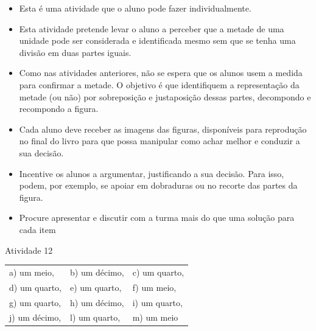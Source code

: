  \vspace{.1cm}

   \vspace{.1cm}

\begin{itemize} %
    \item       Esta é uma atividade que o aluno pode fazer individualmente.
    \item       Esta atividade pretende levar o aluno a perceber que a metade de uma unidade pode ser considerada e identificada mesmo sem que se tenha uma divisão em duas partes iguais.
    \item       Como nas atividades anteriores, não se espera que os alunos usem a medida para confirmar a metade. O objetivo é que identifiquem a representação da metade (ou não) por sobreposição e justaposição dessas partes, decompondo e recompondo a figura.
    \item       Cada aluno deve receber as imagens das figuras, disponíveis para reprodução no final do livro para que possa manipular como achar melhor e conduzir a sua decisão.
    \item       Incentive os alunos a argumentar, justificando a sua decisão. Para isso, podem, por exemplo, se apoiar em dobraduras ou no recorte das partes da figura.
    \item       Procure apresentar e discutir com a turma mais do que uma solução para cada item
\end{itemize} %


\begin{resposta*}{Atividade 12}

\begin{tabular}{lll}
a) um meio,&  b) um décimo,& c) um quarto,\\
d) um quarto,& e) um quarto,& f) um meio,\\
g) um quarto,& h) um décimo,& i) um quarto,\\
j) um décimo,& l) um quarto,& m) um meio
\end{tabular}
\end{resposta*}
